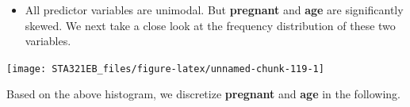 \documentclass[
]{book}
\newenvironment{Shaded}{\begin{snugshade}}{\end{snugshade}}
\newcommand{\AttributeTok}[1]{\textcolor[rgb]{0.13,0.29,0.53}{#1}}
\newcommand{\DecValTok}[1]{\textcolor[rgb]{0.00,0.00,0.81}{#1}}
\newcommand{\FunctionTok}[1]{\textcolor[rgb]{0.13,0.29,0.53}{\textbf{#1}}}
\newcommand{\NormalTok}[1]{#1}
\newcommand{\SpecialCharTok}[1]{\textcolor[rgb]{0.81,0.36,0.00}{\textbf{#1}}}
\newcommand{\StringTok}[1]{\textcolor[rgb]{0.31,0.60,0.02}{#1}}
\providecommand{\tightlist}{%
  \setlength{\itemsep}{0pt}\setlength{\parskip}{0pt}}
\begin{document}
\begin{itemize}
\tightlist
\item
  All predictor variables are unimodal. But \textbf{pregnant} and \textbf{age} are significantly skewed. We next take a close look at the frequency distribution of these two variables.
\end{itemize}

\begin{Shaded}
\end{Shaded}

\begin{center}\texttt{[image: STA321EB\_files/figure-latex/unnamed-chunk-119-1]} \end{center}

Based on the above histogram, we discretize \textbf{pregnant} and \textbf{age} in the following.
\end{document}
